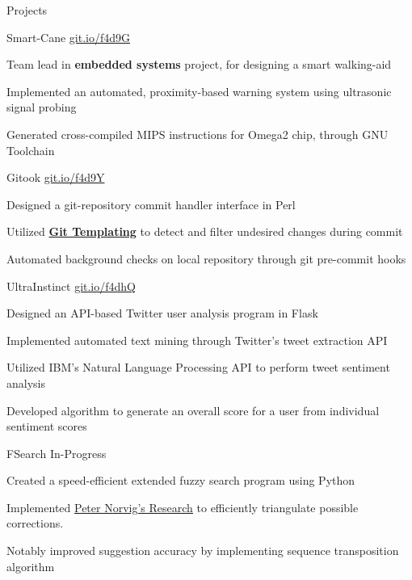 \documentclass{resume} %
\begin{document}

\begin{rSection}{Projects}

  \begin{rProjectSection}{Smart-Cane}
                         {{\href{https://git.io/f4d9G}{git.io/f4d9G}}}
  \item Team lead in \textbf{embedded systems} project, for designing a smart 
  walking-aid
  \item Implemented an automated, proximity-based warning system using
  ultrasonic signal probing
  \item Generated cross-compiled MIPS instructions for Omega2 chip, 
  through GNU Toolchain
  \end{rProjectSection}

  \begin{rProjectSection}{Gitook}
                         {{\href{https://git.io/f4d9Y}{git.io/f4d9Y}}}
  \item Designed a git-repository commit handler interface in Perl
  \item Utilized {\href{https://git-template.readthedocs.io/en/latest/}{\textbf{Git Templating}}} to detect and filter undesired
  changes during commit
  \item Automated background checks on local repository through 
  git pre-commit hooks
  \end{rProjectSection}

  \begin{rProjectSection}{UltraInstinct}
                         {{\href{https://git.io/f4dhQ}{git.io/f4dhQ}}}
  \item Designed an API-based Twitter user analysis program in Flask
  \item Implemented automated text mining through Twitter's tweet 
  extraction API
  \item Utilized IBM's Natural Language Processing API to perform tweet sentiment analysis
  \item Developed algorithm to generate an overall score for a user from
  individual sentiment scores

  \end{rProjectSection}

  \begin{rProjectSection}{FSearch}
                         {In-Progress}
  \item Created a speed-efficient extended fuzzy search program using Python
	\item Implemented \href{http://norvig.com/mayzner.html}{\underline{Peter Norvig's Research}} to efficiently triangulate possible corrections.
	\item Notably improved suggestion accuracy by implementing sequence 
  transposition algorithm
  \end{rProjectSection}

\end{rSection}
\end{document}

